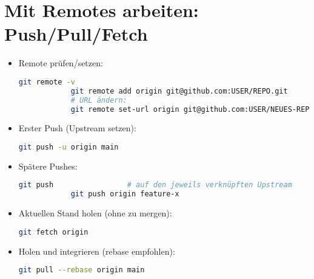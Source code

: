 \documentclass[a4paper,11pt]{article}
\begin{document}
	\section{Mit Remotes arbeiten: Push/Pull/Fetch}
	\begin{itemize}
		\item Remote pr\"ufen/setzen:
		\begin{lstlisting}[language=bash]
			git remote -v
			git remote add origin git@github.com:USER/REPO.git
			# URL ändern:
			git remote set-url origin git@github.com:USER/NEUES-REPO.git
		\end{lstlisting}
		\item Erster Push (Upstream setzen):
		\begin{lstlisting}[language=bash]
			git push -u origin main
		\end{lstlisting}
		\item Sp\"atere Pushes:
		\begin{lstlisting}[language=bash]
			git push                 # auf den jeweils verknüpften Upstream
			git push origin feature-x
		\end{lstlisting}
		\item Aktuellen Stand holen (ohne zu mergen):
		\begin{lstlisting}[language=bash]
			git fetch origin
		\end{lstlisting}
		\item Holen und integrieren (rebase empfohlen):
		\begin{lstlisting}[language=bash]
			git pull --rebase origin main
		\end{lstlisting}
	\end{itemize}
	
\end{document}
